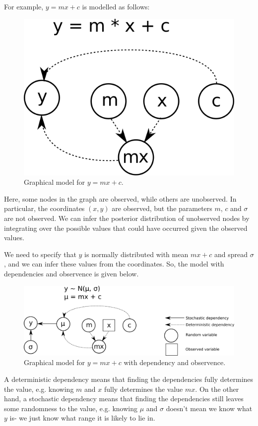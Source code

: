 \documentclass[a4paper, openany]{memoir}
\begin{document}
For example, $y = mx + c$ is modelled as follows:
\begin{figure}[H]
    \centering
    \includegraphics[scale=0.3]{src/5.30 graph model mx+c.png}
    \caption{Graphical model for $y = mx + c$.}
\end{figure}
\noindent Here, some nodes in the graph are observed, while others are unobserved. In particular, the coordinates $(x, y)$ are observed, but the parameters $m$, $c$ and $\sigma$ are not observed. We can infer the posterior distribution of unobserved nodes by integrating over the possible values that could have occurred given the observed values.

We need to specify that $y$ is normally distributed with mean $mx + c$ and spread $\sigma$, and we can infer these values from the coordinates. So, the model with dependencies and observence is given below.
\begin{figure}[H]
    \centering
    \includegraphics[scale=0.3]{src/5.31 linear regression model.png}
    \caption{Graphical model for $y = mx + c$ with dependency and observence.}
\end{figure}
\noindent A deterministic dependency means that finding the dependencies fully determines the value, e.g. knowing $m$ and $x$ fully determines the value $mx$. On the other hand, a stochastic dependency means that finding the dependencies still leaves some randomness to the value, e.g. knowing $\mu$ and $\sigma$ doesn't mean we know what $y$ is- we just know what range it is likely to lie in.
\end{document}
